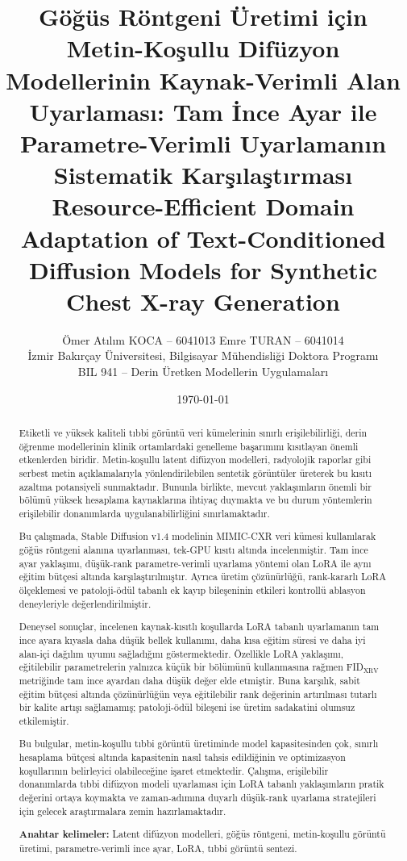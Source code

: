 \documentclass[11pt]{article}
\title{\textbf{Göğüs Röntgeni Üretimi için Metin-Koşullu Difüzyon
Modellerinin Kaynak-Verimli Alan Uyarlaması: Tam İnce Ayar ile
Parametre-Verimli Uyarlamanın Sistematik Karşılaştırması}\\[6pt]
\large Resource-Efficient Domain Adaptation of Text-Conditioned Diffusion
Models for Synthetic Chest X-ray Generation}
\author{Ömer Atılım KOCA -- 6041013 \qquad Emre TURAN -- 6041014\\[2pt]
İzmir Bakırçay Üniversitesi, Bilgisayar Mühendisliği Doktora Programı\\
BIL 941 -- Derin Üretken Modellerin Uygulamaları}
\date{\today}
\begin{document}
\shorthandoff{=}
\maketitle

\begin{abstract}
\noindent
Etiketli ve yüksek kaliteli tıbbi görüntü veri kümelerinin sınırlı erişilebilirliği,
derin öğrenme modellerinin klinik ortamlardaki genelleme başarımını kısıtlayan
önemli etkenlerden biridir. Metin-koşullu latent difüzyon modelleri, radyolojik
raporlar gibi serbest metin açıklamalarıyla yönlendirilebilen sentetik görüntüler
üreterek bu kısıtı azaltma potansiyeli sunmaktadır. Bununla birlikte, mevcut
yaklaşımların önemli bir bölümü yüksek hesaplama kaynaklarına ihtiyaç duymakta
ve bu durum yöntemlerin erişilebilir donanımlarda uygulanabilirliğini
sınırlamaktadır.

Bu çalışmada, Stable Diffusion v1.4 modelinin MIMIC-CXR veri kümesi kullanılarak
göğüs röntgeni alanına uyarlanması, tek-GPU kısıtı altında incelenmiştir. Tam
ince ayar yaklaşımı, düşük-rank parametre-verimli uyarlama yöntemi olan LoRA ile
aynı eğitim bütçesi altında karşılaştırılmıştır. Ayrıca üretim çözünürlüğü,
rank-kararlı LoRA ölçeklemesi ve patoloji-ödül tabanlı ek kayıp bileşeninin
etkileri kontrollü ablasyon deneyleriyle değerlendirilmiştir.

Deneysel sonuçlar, incelenen kaynak-kısıtlı koşullarda LoRA tabanlı uyarlamanın
tam ince ayara kıyasla daha düşük bellek kullanımı, daha kısa eğitim süresi ve
daha iyi alan-içi dağılım uyumu sağladığını göstermektedir. Özellikle LoRA
yaklaşımı, eğitilebilir parametrelerin yalnızca küçük bir bölümünü kullanmasına
rağmen FID$_{\text{XRV}}$ metriğinde tam ince ayardan daha düşük değer elde
etmiştir. Buna karşılık, sabit eğitim bütçesi altında çözünürlüğün veya
eğitilebilir rank değerinin artırılması tutarlı bir kalite artışı sağlamamış;
patoloji-ödül bileşeni ise üretim sadakatini olumsuz etkilemiştir.

Bu bulgular, metin-koşullu tıbbi görüntü üretiminde model kapasitesinden çok,
sınırlı hesaplama bütçesi altında kapasitenin nasıl tahsis edildiğinin ve
optimizasyon koşullarının belirleyici olabileceğine işaret etmektedir.
Çalışma, erişilebilir donanımlarda tıbbi difüzyon modeli uyarlaması için
LoRA tabanlı yaklaşımların pratik değerini ortaya koymakta ve zaman-adımına
duyarlı düşük-rank uyarlama stratejileri için gelecek araştırmalara zemin
hazırlamaktadır.

\smallskip
\noindent\textbf{Anahtar kelimeler:} Latent difüzyon modelleri, göğüs röntgeni,
metin-koşullu görüntü üretimi, parametre-verimli ince ayar, LoRA, tıbbi görüntü
sentezi.
\end{abstract}
\end{document}
